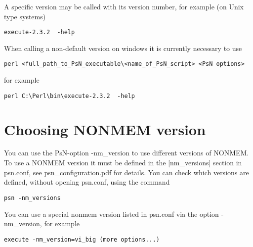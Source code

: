 A specific version may be called with its version number, for example (on Unix type systems)

\begin{verbatim}
execute-2.3.2  -help 
\end{verbatim}

When calling a non-default version on windows it is currently necessary to  use 
\begin{verbatim}
perl <full_path_to_PsN_executable\<name_of_PsN_script> <PsN options>
\end{verbatim}
for example
\begin{verbatim}
perl C:\Perl\bin\execute-2.3.2  -help
\end{verbatim}

\section{Choosing NONMEM version}
You can use the PsN-option -nm\_version to use different versions of NONMEM. To use a NONMEM version it must be defined in the [nm\_versions] section in psn.conf, see psn\_configuration.pdf for details. You can check which versions are defined, without opening psn.conf, using the command

\begin{verbatim}
psn -nm_versions
\end{verbatim}

You can use a special nonmem version listed in psn.conf via the option -nm\_version, for example

\begin{verbatim}
execute -nm_version=vi_big (more options...)
\end{verbatim}

